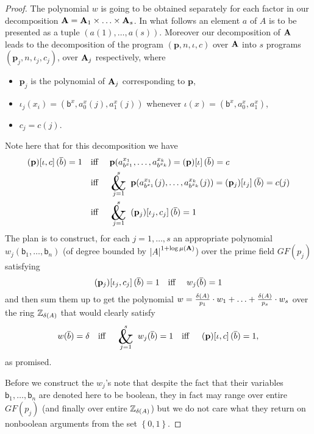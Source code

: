 \documentclass[11pt,a4paper]{amsart}
\newcommand{\m}[1]{{\uppercase {\bf{#1}}}}
\newcommand{\set}[1]{{\left\{ {#1} \right\} }}
\newcommand{\card}[1]{\left| #1 \right|}
\newcommand{\po}[1]{{\mathbf {#1}}}
\newcounter{note}
\renewcommand{\o}[1]{\overline {#1}}
\newcommand{\z}{\mathbb{Z}}
\DeclareMathOperator*{\amper}{\scalerel*{\&}{\sum}}
\newcommand{\progg}[4]{\left(#1,#2,#3,#4\right)}
\newcommand{\prog}[2]{\left(#1\right)\!\left[#2\right]}
\newcommand{\progb}[3]{\left(#1\right)\!\left[#2,#3\right]}
\renewcommand{\b}{\textsf{b}}
\newcommand{\true}{1}
\newcommand{\false}{0}
\newcommand{\bool}{\set{\false,\true}}
\newcommand{\ccc}{c}    \newcommand{\s}{s}
\newcommand{\pdiv}[1]{\ppdiv\left(#1\right)}    \newcommand{\ar}[1]{\mu\left({#1}\right)}       \newcommand{\maxar}[1]{\mu\left({\m #1}\right)}
\begin{document}
\begin{proof}
The polynomial $w$ is going to be obtained separately for each factor in our decomposition
$\m A=\m A_1 \times\ldots\times \m A_\s$.
In what follows an element $a$ of $A$ is to be presented as a tuple $(a(1),\ldots,a(\s))$.
Moreover our decomposition of $\m A$ leads to the decomposition of the program
$\progg{\po p}{n}{\iota}{\ccc}$ over $\m A$ into $\s$ programs
$\progg{\po p_j}{n}{\iota_j}{\ccc_j}$, over $\m A_j$ respectively,
where
\begin{itemize}
  \item $\po p_j$ is the polynomial of $\m A_j$ corresponding to $\po p$,
  \item $\iota_j(x_i)=(\b^x,a^x_0(j),a^x_1(j))$ whenever $\iota(x)=(\b^x,a^x_0, a^x_1)$,
  \item $\ccc_j=\ccc(j)$.
\end{itemize}
Note here that for this decomposition we have
\begin{align*}
\progb{\po p}{\iota}{\ccc}(\o b)=\true
&\mbox{\quad iff \quad}
\po p(a^{x_1}_{b^{x_1}},\ldots,a^{x_k}_{b^{x_k}})=\prog{\po p}{\iota}(\o b)=c
\\
&\mbox{\quad iff \quad}
\amper_{j=1}^{\s} \ \po p(a^{x_1}_{b^{x_1}}(j),\ldots,a^{x_k}_{b^{x_k}}(j))
=\prog{\po p_j}{\iota_j}(\o b)=c(j)
\\
&\mbox{\quad iff \quad}
\amper_{j=1}^{\s} \ \progb{\po p_j}{\iota_j}{\ccc_j}(\o b)=\true
\end{align*}
The plan is to construct, for each $j=1,\ldots,\s$ an appropriate polynomial $w_j(\b_1,\ldots,\b_n)$
(of degree bounded by $\card{A}^{1+\log\maxar A}$)
over the prime field $GF(p_j)$
satisfying
\[
\progb{\po p_j}{\iota_j}{\ccc_j}(\o b)=\true \mbox{\quad iff \quad} w_j(\o b)=\true
\]
and then sum them up to get the polynomial
$w=\frac{\pdiv A}{p_1}\cdot w_1+\ldots+\frac{\pdiv A}{p_\s}\cdot w_\s$
over the ring $\z_{\pdiv{A}}$
that would clearly satisfy
\[
w(\o b) = \ppdiv
\mbox{\quad iff \quad}
\amper_{j=1}^{\s} \ w_j(\o b)=\true
\mbox{\quad iff \quad}
\progb{\po p}{\iota}{\ccc}(\o b)=\true,
\]
as promised.

Before we construct the $w_j$'s note that despite the fact that their variables $\b_1,\ldots,\b_n$ are denoted here to be boolean, they in fact may range over entire $GF(p_j)$
(and finally over entire $\z_{\pdiv{A}}$) but we do not care what they return on nonboolean arguments from the set $\bool$.

\medskip


\end{proof}
\end{document}
